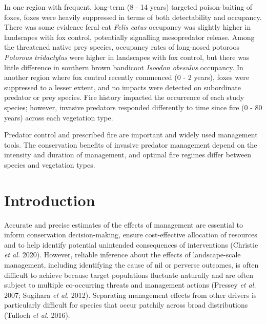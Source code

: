 \documentclass[11pt,a4paper,titlepage,twoside,openright]{style/unimelbthesis}
\begin{document}
\begin{mainmatter}
In one region with frequent, long-term (8 - 14 years) targeted poison-baiting of foxes, foxes were heavily suppressed in terms of both detectability and occupancy. There was some evidence feral cat \emph{Felis catus} occupancy was slightly higher in landscapes with fox control, potentially signalling mesopredator release. Among the threatened native prey species, occupancy rates of long-nosed potoroos \emph{Potorous tridactylus} were higher in landscapes with fox control, but there was little difference in southern brown bandicoot \emph{Isoodon obesulus} occupancy. In another region where fox control recently commenced (0 - 2 years), foxes were suppressed to a lesser extent, and no impacts were detected on subordinate predator or prey species. Fire history impacted the occurrence of each study species; however, invasive predators responded differently to time since fire (0 - 80 years) across each vegetation type.

Predator control and prescribed fire are important and widely used management tools. The conservation benefits of invasive predator management depend on the intensity and duration of management, and optimal fire regimes differ between species and vegetation types.

\newpage

\hypertarget{introduction-1}{%
\section{Introduction}\label{introduction-1}}

Accurate and precise estimates of the effects of management are essential to inform conservation decision-making, ensure cost-effective allocation of resources and to help identify potential unintended consequences of interventions (Christie \emph{et al.} 2020). However, reliable inference about the effects of landscape-scale management, including identifying the cause of nil or perverse outcomes, is often difficult to achieve because target populations fluctuate naturally and are often subject to multiple co-occurring threats and management actions (Pressey \emph{et al.} 2007; Sugihara \emph{et al.} 2012). Separating management effects from other drivers is particularly difficult for species that occur patchily across broad distributions (Tulloch \emph{et al.} 2016).


\end{mainmatter}
\end{document}
